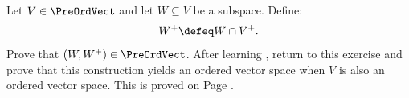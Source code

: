 %
%
\label {ex: subspaces of preordered vector spaces are preordered}Let $V \in \PreOrdVect$ and let $W \subseteq V$ be a subspace. Define:
\[W^+ \defeq W \cap V^+.\]
Prove that $(W,W^+) \in \PreOrdVect$. After learning , return to this exercise and prove that this construction yields an ordered vector space when $V$ is also an ordered vector space. This is proved on Page \pageref{sol: subspaces and quotients of preordered vector spaces are preordered}.
